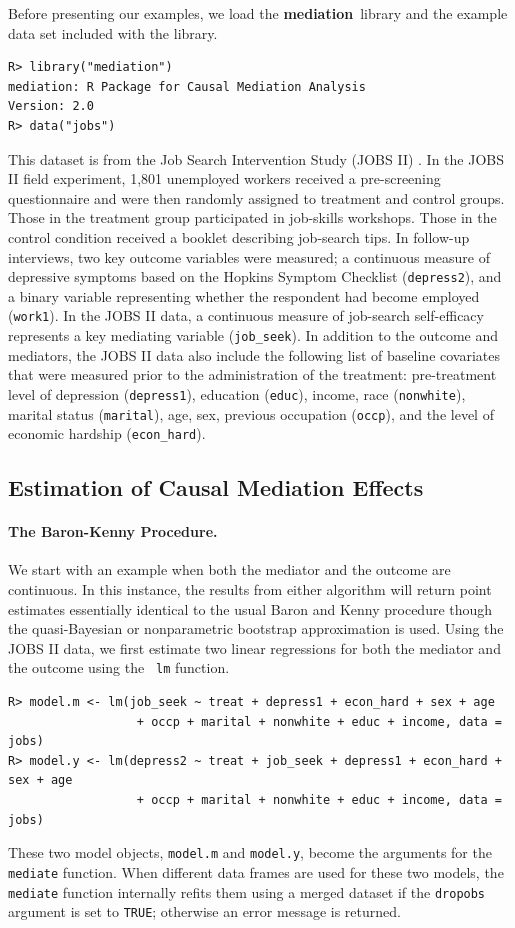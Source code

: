 \documentclass[11pt,letterpaper]{article}
\theoremstyle{plain}
\newcommand\bmediation{{\bf mediation}}
\begin{document}
Before presenting our examples, we load the \bmediation\ library and
the example data set included with the library.
\begin{verbatim}
R> library("mediation")
mediation: R Package for Causal Mediation Analysis
Version: 2.0
R> data("jobs")
\end{verbatim}
This dataset is from the Job Search Intervention Study (JOBS II)
\citep{Vinokur:1997}. In the JOBS II field experiment, 1,801
unemployed workers received a pre-screening questionnaire and were
then randomly assigned to treatment and control groups. Those in the
treatment group participated in job-skills workshops.  Those in the
control condition received a booklet describing job-search tips. In
follow-up interviews, two key outcome variables were measured; a
continuous measure of depressive symptoms based on the Hopkins Symptom
Checklist (\texttt{depress2}), and a binary variable representing
whether the respondent had become employed (\texttt{work1}). In the
JOBS II data, a continuous measure of job-search self-efficacy
represents a key mediating variable (\texttt{job\_seek}). In addition
to the outcome and mediators, the JOBS II data also include the
following list of baseline covariates that were measured prior to the
administration of the treatment: pre-treatment level of depression
(\texttt{depress1}), education (\texttt{educ}), income, race
(\texttt{nonwhite}), marital status (\texttt{marital}), age, sex,
previous occupation (\texttt{occp}), and the level of economic
hardship (\texttt{econ\_hard}).

\subsection{Estimation of Causal Mediation Effects}

\paragraph{The Baron-Kenny Procedure.}
We start with an example when both the mediator and the outcome are
continuous.  In this instance, the results from either algorithm will
return point estimates essentially identical to the usual Baron and
Kenny procedure though the quasi-Bayesian or nonparametric bootstrap
approximation is used.  Using the JOBS II data, we first estimate two
linear regressions for both the mediator and the outcome using the {\tt
lm} function.
\begin{verbatim}
R> model.m <- lm(job_seek ~ treat + depress1 + econ_hard + sex + age
                  + occp + marital + nonwhite + educ + income, data = jobs)
R> model.y <- lm(depress2 ~ treat + job_seek + depress1 + econ_hard + sex + age
                  + occp + marital + nonwhite + educ + income, data = jobs)
\end{verbatim}
These two model objects, {\tt model.m} and {\tt model.y}, become the
arguments for the \texttt{mediate} function.  When different data frames
are used for these two models, the {\tt mediate} function internally refits
them using a merged dataset if the {\tt dropobs} argument is set to
{\tt TRUE}; otherwise an error message is returned.
\end{document}
